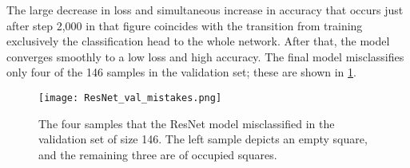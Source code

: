 \documentclass[../report.tex]{subfiles}
\begin{document}
The large decrease in loss and simultaneous increase in accuracy that occurs just after step 2,000 in that figure coincides with the transition from training exclusively the classification head to the whole network.
After that, the model converges smoothly to a low loss and high accuracy.
The final model misclassifies only four of the 146 samples in the validation set; these are shown in \cref{fig:occupancy_resnet_mistakes}.
\begin{figure}
    \texttt{[image: ResNet\_val\_mistakes.png]}
    \caption[The four samples that the ResNet model misclassified in the validation set.]{The four samples that the ResNet model misclassified in the validation set of size 146. The left sample depicts an empty square, and the remaining three are of occupied squares.}
    \label{fig:occupancy_resnet_mistakes}
\end{figure}
\end{document}
